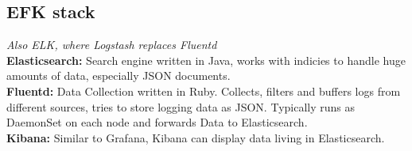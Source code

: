 \subsection{EFK stack}
\textit{Also ELK, where Logstash replaces Fluentd} \\
\textbf{Elasticsearch:} Search engine written in Java, works with indicies to handle huge amounts of data, especially JSON documents. \\
\textbf{Fluentd:} Data Collection written in Ruby. Collects, filters and buffers logs from different sources, tries to store logging data as JSON. Typically runs as DaemonSet on each node and forwards Data to Elasticsearch. \\
\textbf{Kibana:} Similar to Grafana, Kibana can display data living in Elasticsearch. \\
